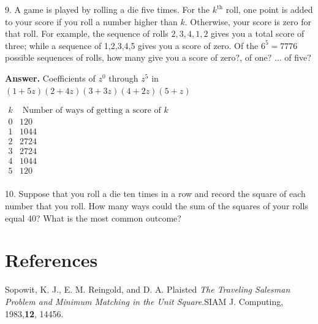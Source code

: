 \documentclass[10pt,]{book}
\theoremstyle{plain}
\theoremstyle{definition}
\theoremstyle{definition}
\theoremstyle{definition}
\theoremstyle{definition}
\numberwithin{equation}{section}
\begin{document}
\begin{exercisegroup}
\item[9.]\hypertarget{exercise-15}{}A game is played by rolling a die five times. For the \(k^{\text{th}}\) roll, one point is added to your score if you roll a number higher
than \(k\). Otherwise, your score is zero for that roll. For example, the sequence of rolls \(2,3,4,1,2\) gives you a total score of three;
while a sequence of 1,2,3,4,5 gives you a score of zero. Of the \(6^5 = 7776\) possible sequences of rolls, how many give you a score of zero?, of
one? \(\ldots \) of five?%
\par\smallskip
\par\smallskip
\noindent\textbf{Answer.}\hypertarget{answer-8}{}\quad
 Coefficients of \(z^0\) through \(z^5\) in \((1+5z)(2+4z)(3+3z)(4+2z)(5+z)\)%
\par

\(\begin{array}{cc}
 k & \textrm{ Number of ways of getting a score of } k \\
 0 & 120 \\
 1 & 1044 \\
 2 & 2724 \\
 3 & 2724 \\
 4 & 1044 \\
 5 & 120 \\
\end{array}\)%
\item[10.]\hypertarget{exercise-16}{} Suppose that you roll a die ten times in a row and record the square of each number that you roll. How many ways could the sum of the squares
of your rolls equal 40? What is the most common outcome?%
\par\smallskip
\end{exercisegroup}
\par\smallskip\noindent
%
\backmatter
%
%
%
\typeout{************************************************}
\typeout{************************************************}
\chapter[References]{References}\label{references-1}
\begin{referencelist}
\hypertarget{biblio-sopowit-1983}{}Sopowit, K. J., E. M. Reingold, and D. A. Plaisted \textit{The Traveling Salesman Problem and Minimum Matching in the Unit Square}.SIAM J. Computing, 1983,\textbf{12}, 144\textendash{}56.
\end{referencelist}
%
\printindex
%
\end{document}
